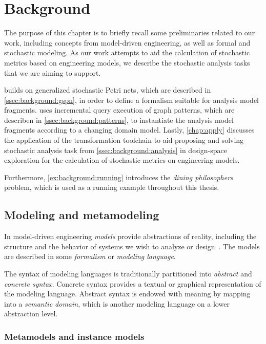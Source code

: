 \chapter{Background}
\label{chap:background}

The purpose of this chapter is to briefly recall some preliminaries related to our work, including concepts from model-driven engineering, as well as formal and stochastic modeling. As our work attempts to aid the calculation of stochastic metrics based on engineering models, we describe the stochastic analysis tasks that we are aiming to support.

 builds on generalized stochastic Petri nets, which are described in \vref{ssec:background:gspn}, in order to define a formalism suitable for analysis model fragments.  uses incremental query execution of graph patterns, which are describen in \vref{ssec:background:patterns}, to instantiate the analysis model fragments according to a changing domain model. Lastly, \cref{chap:apply} discusses the application of the transformation toolchain to aid proposing and solving stochastic analysis task from \vref{ssec:background:analysis} in design-space exploration for the calculation of stochastic metrics on engineering models.

Furthermore, \vref{ex:background:running} introduces the \emph{dining philosophers} problem, which is used as a running example throughout this thesis.

\section{Modeling and metamodeling}

In model-driven engineering \emph{models} provide abstractions of reality, including the structure and the behavior of systems we wish to analyze or design~\citep{Giese06multiparadigm}. The models are described in some \emph{formalism} or \emph{modeling language}.

The syntax of modeling languages is traditionally partitioned into \emph{abstract} and \emph{concrete syntax}. Concrete syntax provides a textual or graphical representation of the modeling language. Abstract syntax is endowed with meaning by mapping into a \emph{semantic domain}, which is another modeling language on a lower abstraction level.

\subsection{Metamodels and instance models}


